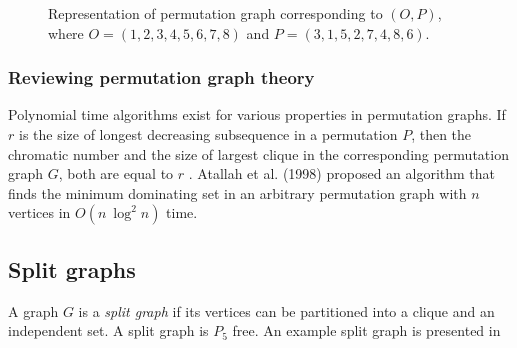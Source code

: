 \begin{figure}
	\centering
	\caption{Representation of permutation graph corresponding to $(O, P)$, where $O = (1, 2, 3, 4, 5, 6, 7, 8)$ and $P = (3, 1, 5, 2, 7, 4, 8, 6)$.}
	\label{figure:example-permutation-graph}
\end{figure}

\subsubsection{Reviewing permutation graph theory}

Polynomial time algorithms exist for various properties in permutation graphs. If $r$ is the size of longest decreasing subsequence in a permutation $P$, then the chromatic number and the size of largest clique in the corresponding permutation graph $G$, both are equal to $r$ \cite{Golumbic2004}.  Atallah et al. (1998) \cite{Atallah1988} proposed an algorithm that finds the minimum dominating set in an arbitrary permutation graph with $n$ vertices in $O(n\ \log^2 n)$ time.

\subsection{Split graphs}\label{subsection:split-graphs}

A graph $G$ is a \textit{split graph} if its vertices can be partitioned into a clique and an independent set. A split graph is $P_5$ free. An example split graph is presented in 

